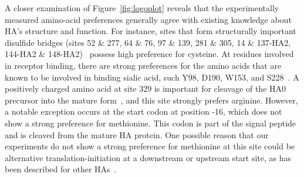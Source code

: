 \documentclass[9pt,twocolumn,twoside]{pnas-new}
\begin{document}
A closer examination of Figure~\ref{fig:logoplot} reveals that the experimentally measured amino-acid preferences generally agree with existing knowledge about HA's structure and function.
For instance, sites that form structurally important disulfide bridges (sites 52 \& 277, 64 \& 76, 97 \& 139, 281 \& 305, 14 \& 137-HA2, 144-HA2 \& 148-HA2)~\cite{waterfield1981disulphide} possess high preference for cysteine.
At residues involved in receptor binding, there are strong preferences for the amino acids that are known to be involved in binding sialic acid, such Y98, D190, W153, and S228~\cite{weis1988structure,martin1998studies,nobusawa2000change,yang2015structure}.
A positively charged amino acid at site 329 is important for cleavage of the HA0 precursor into the mature form~\cite{kido1992isolation, stech2005new}, and this site strongly prefers arginine.
However, a notable exception occurs at the start codon at position -16, which does not show a strong preference for methionine. 
This codon is part of the signal peptide and is cleaved from the mature HA protein.
One possible reason that our experiments do not show a strong preference for methionine at this site could be alternative translation-initiation at a downstream or upstream start site, as has been described for other HAs~\cite{girard2011upstream}.
\end{document}
